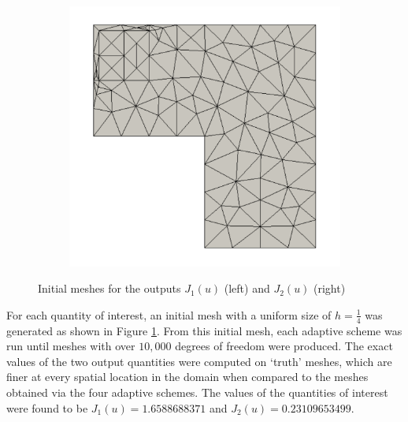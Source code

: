 \begin{figure}[hbt!]
\begin{subfigure}{.3\textwidth}
\includegraphics[width=.99\linewidth]{img/vms_lshape_square_initial}
\end{subfigure}%
\caption{Initial meshes for the outputs $J_1(u)$ (left) and $J_2(u)$ (right)}
\label{fig:global_meshes}
\end{figure}

For each quantity of interest, an initial mesh with
a uniform size of $h=\frac{1}{4}$ was generated as
shown in Figure \ref{fig:global_meshes}. From this
initial mesh, each adaptive scheme was run until
meshes with over $10,000$ degrees of freedom were
produced. The exact values of the two output quantities
were computed on `truth' meshes, which are finer
at every spatial location in the domain when compared
to the meshes obtained via the four adaptive schemes.
The values of the  quantities of interest were found to be
$J_1(u) = 1.6588688371$ and $J_2(u) = 0.23109653499$.

